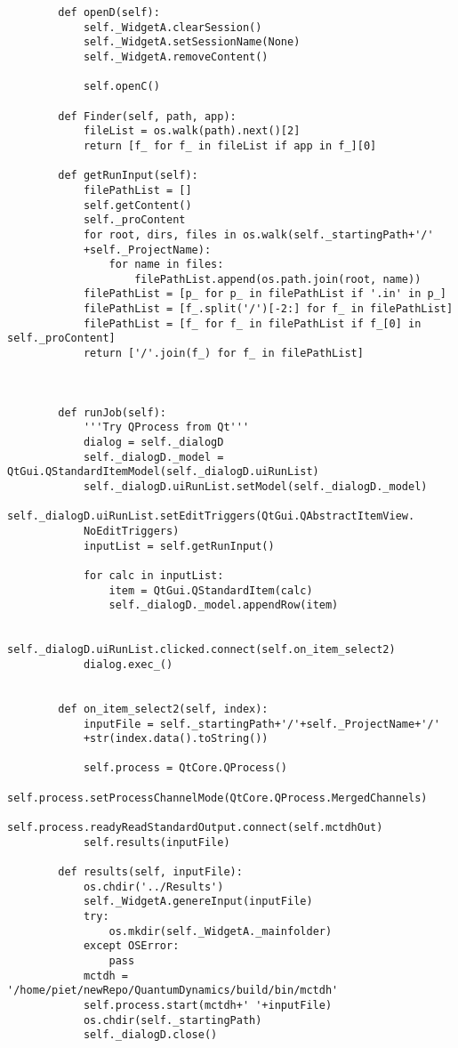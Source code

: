 \begin{verbatim}
        def openD(self):
            self._WidgetA.clearSession()
            self._WidgetA.setSessionName(None)
            self._WidgetA.removeContent()
    
            self.openC()
    
        def Finder(self, path, app):
            fileList = os.walk(path).next()[2]
            return [f_ for f_ in fileList if app in f_][0]
    
        def getRunInput(self):
            filePathList = []
            self.getContent()
            self._proContent
            for root, dirs, files in os.walk(self._startingPath+'/'
            +self._ProjectName):
                for name in files:
                    filePathList.append(os.path.join(root, name))
            filePathList = [p_ for p_ in filePathList if '.in' in p_]
            filePathList = [f_.split('/')[-2:] for f_ in filePathList]
            filePathList = [f_ for f_ in filePathList if f_[0] in self._proContent]
            return ['/'.join(f_) for f_ in filePathList]
    
        
    
        def runJob(self):
            '''Try QProcess from Qt'''
            dialog = self._dialogD
            self._dialogD._model = QtGui.QStandardItemModel(self._dialogD.uiRunList)
            self._dialogD.uiRunList.setModel(self._dialogD._model)
            self._dialogD.uiRunList.setEditTriggers(QtGui.QAbstractItemView.
            NoEditTriggers)
            inputList = self.getRunInput()
    
            for calc in inputList:
                item = QtGui.QStandardItem(calc)
                self._dialogD._model.appendRow(item)
    
            self._dialogD.uiRunList.clicked.connect(self.on_item_select2)
            dialog.exec_()
            
    
        def on_item_select2(self, index):
            inputFile = self._startingPath+'/'+self._ProjectName+'/'
            +str(index.data().toString())
    
            self.process = QtCore.QProcess()
            self.process.setProcessChannelMode(QtCore.QProcess.MergedChannels)
            self.process.readyReadStandardOutput.connect(self.mctdhOut)
            self.results(inputFile)
    
        def results(self, inputFile):
            os.chdir('../Results')
            self._WidgetA.genereInput(inputFile)
            try:
                os.mkdir(self._WidgetA._mainfolder)
            except OSError:
                pass
            mctdh = '/home/piet/newRepo/QuantumDynamics/build/bin/mctdh'
            self.process.start(mctdh+' '+inputFile)
            os.chdir(self._startingPath)
            self._dialogD.close()
    

\end{verbatim}
